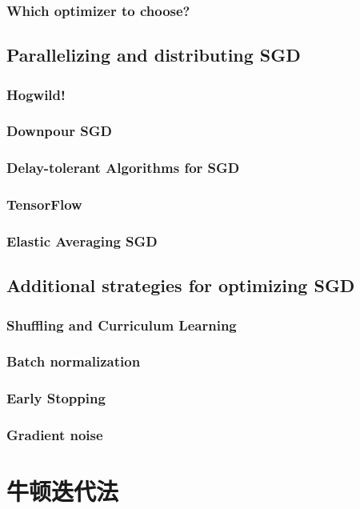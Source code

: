 \documentclass[a4paper,10pt]{ctexbook}
\begin{document}
\subsubsection{Which optimizer to choose?}

\subsection{Parallelizing and distributing SGD}
\subsubsection{Hogwild!}
\subsubsection{Downpour SGD}
\subsubsection{Delay-tolerant Algorithms for SGD}
\subsubsection{TensorFlow}

\subsubsection{Elastic Averaging SGD}
\subsection{Additional strategies for optimizing SGD}
\subsubsection{Shuffling and Curriculum Learning}
\subsubsection{Batch normalization}

\subsubsection{Early Stopping}
\subsubsection{Gradient noise}


\section{牛顿迭代法}
\end{document}

